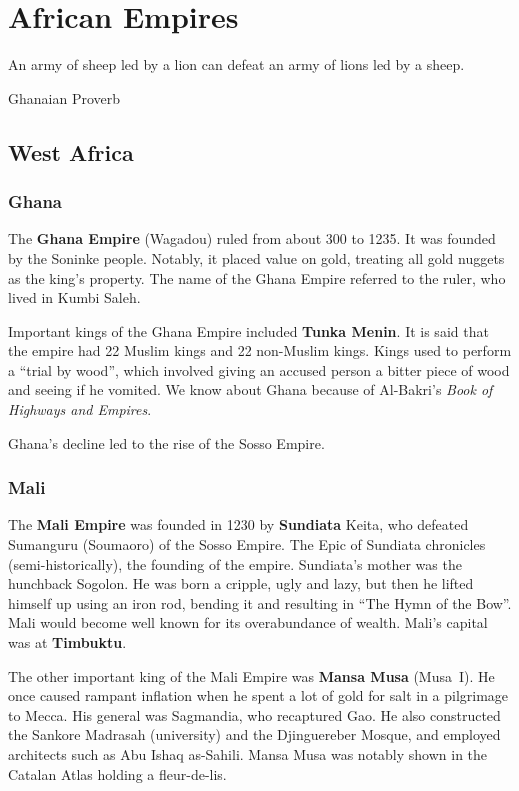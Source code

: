 \chapter{African Empires}

\epigraph{%
  An army of sheep led by a lion can defeat an army of lions led by a sheep.
}{Ghanaian Proverb}

\section{West Africa}

\subsection*{Ghana}

The \textbf{Ghana Empire} (Wagadou) ruled from about 300 to 1235.
It was founded by the Soninke people.
Notably, it placed value on gold, treating all gold nuggets as the king's property.
The name of the Ghana Empire referred to the ruler, who lived in Kumbi Saleh.

Important kings of the Ghana Empire included \textbf{Tunka Menin}.
It is said that the empire had 22 Muslim kings and 22 non-Muslim kings.
Kings used to perform a ``trial by wood'',
which involved giving an accused person a bitter piece of wood and seeing if he vomited.
We know about Ghana because of Al-Bakri's \textit{Book of Highways and Empires}.

Ghana's decline led to the rise of the Sosso Empire.

\subsection*{Mali}

The \textbf{Mali Empire} was founded in 1230 by \textbf{Sundiata} Keita,
who defeated Sumanguru (Soumaoro) of the Sosso Empire.
The Epic of Sundiata chronicles (semi-historically), the founding of the empire.
Sundiata's mother was the hunchback Sogolon.
He was born a cripple, ugly and lazy,
but then he lifted himself up using an iron rod, bending it and resulting in ``The Hymn of the Bow''.
Mali would become well known for its overabundance of wealth.
Mali's capital was at \textbf{Timbuktu}.

The other important king of the Mali Empire was \textbf{Mansa Musa} (Musa~I).
He once caused rampant inflation when he spent a lot of gold for salt in a pilgrimage to Mecca.
His general was Sagmandia, who recaptured Gao.
He also constructed the Sankore Madrasah (university) and the Djinguereber Mosque,
and employed architects such as Abu Ishaq as-Sahili.
Mansa Musa was notably shown in the Catalan Atlas holding a fleur-de-lis.

